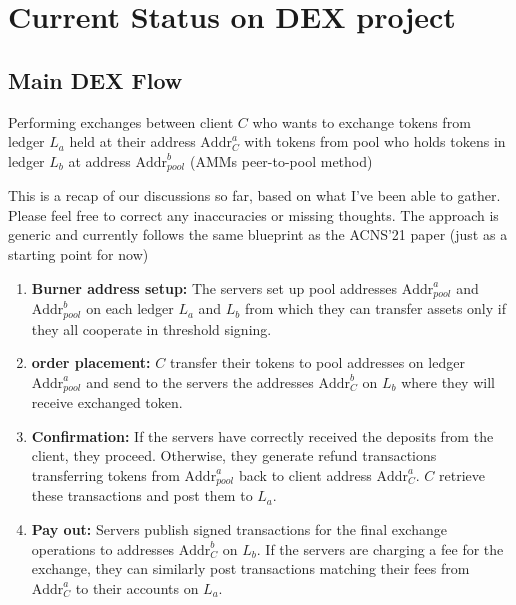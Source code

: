 \documentclass{article}
\begin{document}
\section{Current Status on DEX project}

\subsection{Main DEX Flow}

Performing exchanges between client $C$ who wants to exchange tokens from ledger $L_a$ held at their address $\text{Addr}_{C}^{a}$ with tokens from pool who holds tokens in ledger $L_b$ at address $\text{Addr}_{pool}^{b}$ (AMMs peer-to-pool method)

This is a recap of our discussions so far, based on what I’ve been able to gather. Please feel free to correct any inaccuracies or missing thoughts. The approach is generic and currently follows the same blueprint as the ACNS'21 paper (just as a starting point for now)


\begin{enumerate}
    \item \textbf{Burner address setup:} The servers set up pool addresses $\text{Addr}_{pool}^a$ and $\text{Addr}_{pool}^b$ on each ledger $L_a$ and $L_b$ from which they can transfer assets only if they all cooperate in threshold signing.
    \item \textbf{order placement:} $C$ transfer their tokens to pool addresses on ledger $\text{Addr}_{pool}^a$ and send to the servers the addresses $\text{Addr}_C^{b}$ on $L_b$ where they will receive exchanged token. 
    \item \textbf{Confirmation:} If the servers have correctly received the deposits from the client, they proceed. Otherwise, they generate refund transactions transferring tokens from $\text{Addr}_{pool}^{a}$ back to client address $\text{Addr}_C^{a}$. $C$ retrieve these transactions and post them to $L_a$.
    \item \textbf{Pay out:} Servers publish signed transactions for the final exchange operations to addresses $\text{Addr}_C^{b}$ on $L_b$. If the servers are charging a fee for the exchange, they can similarly post transactions matching their fees from $\text{Addr}_C^{a}$ to their accounts on $L_a$.
\end{enumerate}
\end{document}
